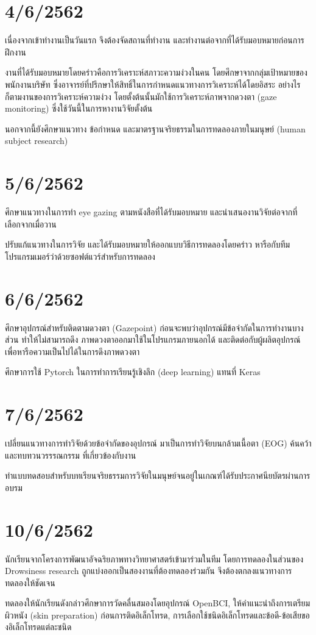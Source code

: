 \section*{4/6/2562}

เนื่องจากเข้าทำงานเป็นวันแรก จึงต้องจัดสถานที่ทำงาน และทำงานต่อจากที่ได้รับมอบหมายก่อนการฝึกงาน

งานที่ได้รับมอบหมายโดยคร่าวคือการวิเคราะห์สภาวะความง่วงในคน โดยศึกษาจากกลุ่มเป้าหมายของพนักงานบริษัท
ซึ่งอาจารย์ที่ปรึกษาให้สิทธิ์ในการกำหนดแนวทางการวิเคราะห์ได้โดยอิสระ อย่างไรก็ตามงานของการวิเคราะห์ความง่วง
โดยตั้งต้นนั้นมักใช้การวิเคราะห์ภาพจากดวงตา (gaze monitoring) ซึ่งใช้วันนี้ในการหางานวิจัยตั้งต้น

นอกจากนี้ยังศึกษาแนวทาง ข้อกำหนด และมาตรฐานจริยธรรมในการทดลองภายในมนุษย์ (human subject research)

\section*{5/6/2562}

ศึกษาแนวทางในการทำ eye gazing ตามหนังสือที่ได้รับมอบหมาย และนำเสนองานวิจัยต่อจากที่เลือกจากเมื่อวาน

ปรับแก้แนวทางในการวิจัย และได้รับมอบหมายให้ออกแบบวิธีการทดลองโดยคร่าว
หารือกับทีมโปรแกรมเมอร์ว่าด้วยซอฟต์แวร์สำหรับการทดลอง

\section*{6/6/2562}

ศึกษาอุปกรณ์สำหรับติดตามดวงตา (Gazepoint) ก่อนจะพบว่าอุปกรณ์มีข้อจำกัดในการทำงานบางส่วน ทำให้ไม่สามารถดึง
ภาพดวงตาออกมาใช้ในโปรแกรมภายนอกได้ และติดต่อกับผู้ผลิตอุปกรณ์เพื่อหารือความเป็นไปได้ในการดึงภาพดวงตา

ศึกษาการใช้ Pytorch ในการทำการเรียนรู้เชิงลึก (deep learning) แทนที่ Keras

\section*{7/6/2562}

เปลี่ยนแนวทางการทำวิจัยด้วยข้อจำกัดของอุปกรณ์ มาเป็นการทำวิจัยบนกล้ามเนื้อตา (EOG) ค้นคว้าและทบทวนวรรรณกรรม
ที่เกี่ยวข้องกับงาน

ทำแบบทดสอบสำหรับบทเรียนจริยธรรมการวิจัยในมนุษย์จนอยู่ในเกณฑ์ได้รับประกาศนียบัตรผ่านการอบรม

\section*{10/6/2562}

นักเรียนจากโครงการพัฒนาอัจฉริยภาพทางวิทยาศาสตร์เข้ามาร่วมในทีม โดยการทดลองในส่วนของ Drowsiness research
ถูกแบ่งออกเป็นสองงานที่ต้องทดลองร่วมกัน จึงต้องตกลงแนวทางการทดลองให้ชัดเจน

ทดลองให้นักเรียนดังกล่าวศึกษาการวัดคลื่นสมองโดยอุปกรณ์ OpenBCI, ให้คำแนะนำถึงการเตรียมผิวหนัง (skin preparation)
ก่อนการติดอิเล็กโทรด, การเลือกใช้ชนิดอิเล็กโทรดและข้อดี-ข้อเสียของอิเล็กโทรดแต่ละชนิด